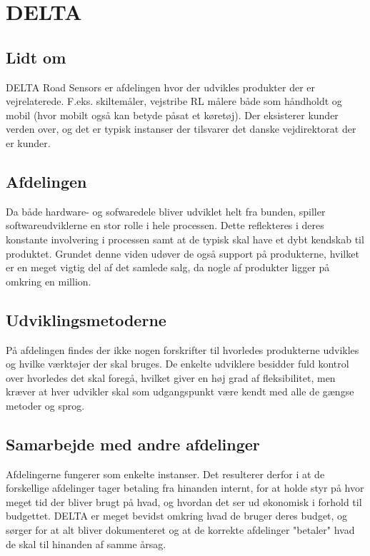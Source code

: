 \section{DELTA}

\subsection{Lidt om}
DELTA Road Sensors er afdelingen hvor der udvikles produkter der er vejrelaterede. F.eks. skiltemåler, vejstribe RL målere både som håndholdt og mobil (hvor mobilt også kan betyde påsat et køretøj). Der eksisterer kunder verden over, og det er typisk instanser der tilsvarer det danske vejdirektorat der er kunder.

\subsection{Afdelingen}
Da både hardware- og sofwaredele bliver udviklet helt fra bunden, spiller softwareudviklerne en stor rolle i hele processen. Dette reflekteres i deres konstante involvering i processen samt at de typisk skal have et dybt kendskab til produktet. Grundet denne viden udøver de også support på produkterne, hvilket er en meget vigtig del af det samlede salg, da nogle af produkter ligger på omkring en million.

\subsection{Udviklingsmetoderne}
På afdelingen findes der ikke nogen forskrifter til hvorledes produkterne udvikles og hvilke værktøjer der skal bruges. De enkelte udviklere besidder fuld kontrol over hvorledes det skal foregå, hvilket giver en høj grad af fleksibilitet, men kræver at hver udvikler skal som udgangspunkt være kendt med alle de gængse metoder og sprog.

\subsection{Samarbejde med andre afdelinger}
Afdelingerne fungerer som enkelte instanser.
Det resulterer derfor i at de forskellige afdelinger tager betaling fra hinanden internt, for at holde styr på hvor meget tid der bliver brugt på hvad, og hvordan det ser ud økonomisk i forhold til budgettet. DELTA er meget bevidst omkring hvad de bruger deres budget, og sørger for at alt bliver dokumenteret og at de korrekte afdelinger "betaler" hvad de skal til hinanden af samme årsag.



